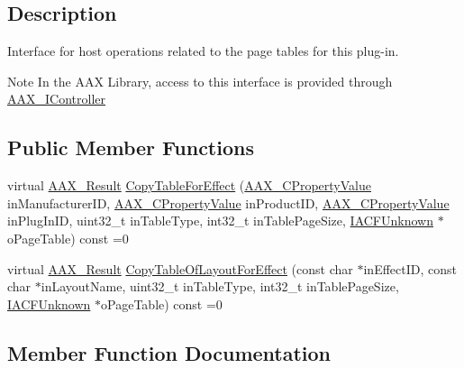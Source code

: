 \subsection{Description}
Interface for host operations related to the page tables for this plug-\/in. 

\begin{DoxyNote}{Note}
In the A\+A\+X Library, access to this interface is provided through \hyperlink{a00090}{A\+A\+X\+\_\+\+I\+Controller} 
\end{DoxyNote}
\subsection*{Public Member Functions}
\begin{DoxyCompactItemize}
\item 
virtual \hyperlink{a00149_a4d8f69a697df7f70c3a8e9b8ee130d2f}{A\+A\+X\+\_\+\+Result} \hyperlink{a00076_a30b6356226881d6d60fb26aabea19d76}{Copy\+Table\+For\+Effect} (\hyperlink{a00149_ab247c0d8686c14e05cbb567ef276f249}{A\+A\+X\+\_\+\+C\+Property\+Value} in\+Manufacturer\+I\+D, \hyperlink{a00149_ab247c0d8686c14e05cbb567ef276f249}{A\+A\+X\+\_\+\+C\+Property\+Value} in\+Product\+I\+D, \hyperlink{a00149_ab247c0d8686c14e05cbb567ef276f249}{A\+A\+X\+\_\+\+C\+Property\+Value} in\+Plug\+In\+I\+D, uint32\+\_\+t in\+Table\+Type, int32\+\_\+t in\+Table\+Page\+Size, \hyperlink{a00146}{I\+A\+C\+F\+Unknown} $\ast$o\+Page\+Table) const =0
\item 
virtual \hyperlink{a00149_a4d8f69a697df7f70c3a8e9b8ee130d2f}{A\+A\+X\+\_\+\+Result} \hyperlink{a00076_a75965c6121b8041746e0a39f46d6fa8d}{Copy\+Table\+Of\+Layout\+For\+Effect} (const char $\ast$in\+Effect\+I\+D, const char $\ast$in\+Layout\+Name, uint32\+\_\+t in\+Table\+Type, int32\+\_\+t in\+Table\+Page\+Size, \hyperlink{a00146}{I\+A\+C\+F\+Unknown} $\ast$o\+Page\+Table) const =0
\end{DoxyCompactItemize}


\subsection{Member Function Documentation}
\hypertarget{a00076_a30b6356226881d6d60fb26aabea19d76}{}
